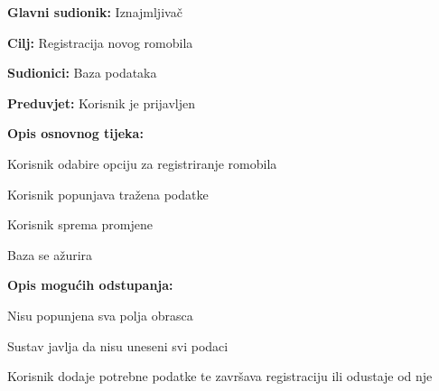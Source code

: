 						\noindent {}
					\begin{packed_item}
	
						\item \textbf{Glavni sudionik: }Iznajmljivač
						\item  \textbf{Cilj: }Registracija novog romobila
						\item  \textbf{Sudionici: }Baza podataka
						\item  \textbf{Preduvjet: }Korisnik je prijavljen
						\item  \textbf{Opis osnovnog tijeka:}
						
						\item[] \begin{packed_enum}
	
							\item Korisnik odabire opciju za registriranje romobila
							\item Korisnik popunjava tražena podatke
							\item Korisnik sprema promjene
							\item Baza se ažurira


						\end{packed_enum}
						
						\item  \textbf{Opis mogućih odstupanja:}
						
						\item[] \begin{packed_item}
	
							\item[2.a] Nisu popunjena sva polja obrasca
							\item[] \begin{packed_enum}
								
								\item Sustav javlja da nisu uneseni svi podaci
								\item Korisnik dodaje potrebne podatke te završava registraciju ili odustaje od nje

								
							\end{packed_enum}
							
						\end{packed_item}						
					\end{packed_item}	






